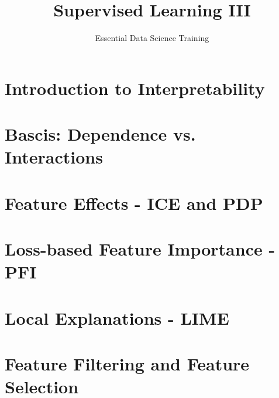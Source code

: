 \documentclass[13pt,compress]{beamer}
\title{Supervised Learning III}
\author{Essential Data Science Training}
\date{}
\begin{document}


\frame{\titlepage}

\section{Introduction to Interpretability}


\section{Bascis: Dependence vs. Interactions}


\section{Feature Effects - ICE and PDP}



\section{Loss-based Feature Importance - PFI}


\section{Local Explanations - LIME}


\section{Feature Filtering and Feature Selection}





\end{document}
